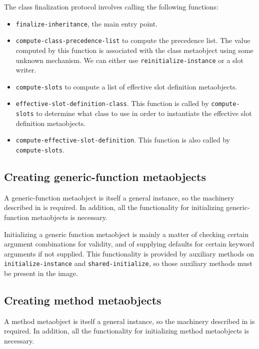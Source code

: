 The class finalization protocol involves calling the following
functions:

\begin{itemize}
\item \texttt{finalize-inheritance}, the main entry point.
\item \texttt{compute-class-precedence-list} to compute the
  precedence list.  The value computed by this function is associated
  with the class metaobject using some unknown mechanism.  We can
  either use \texttt{reinitialize-instance} or a slot writer.
\item \texttt{compute-slots} to compute a list of effective
  slot definition metaobjects.
\item \texttt{effective-slot-definition-class}.  This function is
  called by \texttt{compute-slots} to determine what class to use in
  order to instantiate the effective slot definition metaobjects.
\item \texttt{compute-effective-slot-definition}.  This function is
  also called by \texttt{compute-slots}.
\end{itemize}

\subsection{Creating generic-function metaobjects}

A generic-function metaobject is itself a general instance, so the
machinery described in
 is required.  In
addition, all the functionality for initializing generic-function
metaobjects is necessary.

Initializing a generic function metaobject is mainly a matter of
checking certain argument combinations for validity, and of supplying
defaults for certain keyword arguments if not supplied.  This
functionality is provided by auxiliary methods on
\texttt{initialize-instance} and \texttt{shared-initialize}, so those
auxiliary methods must be present in the image.

\subsection{Creating method metaobjects}

A method metaobject is itself a general instance, so the machinery
described in  is
required.  In addition, all the functionality for initializing method
metaobjects is necessary.

